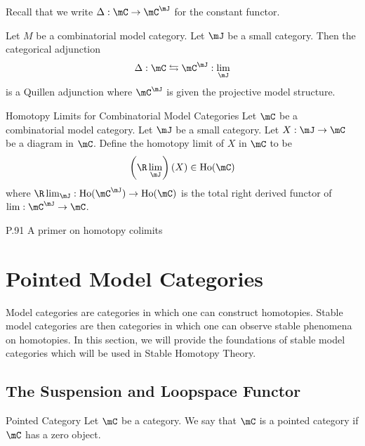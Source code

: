 \documentclass[a4paper]{article}
\begin{document}
Recall that we write $\Delta:\mC\to\mC^\mJ$ for the constant functor. 

\begin{prp}{}{} Let $M$ be a combinatorial model category. Let $\mJ$ be a small category. Then the categorical adjunction $$\Delta:\mC\leftrightarrows\mC^\mJ:\lim_\mJ$$ is a Quillen adjunction where $\mC^\mJ$ is given the projective model structure. 
\end{prp}

\begin{defn}{Homotopy Limits for Combinatorial Model Categories}{} Let $\mC$ be a combinatorial model category. Let $\mJ$ be a small category. Let $X:\mJ\to\mC$ be a diagram in $\mC$. Define the homotopy limit of $X$ in $\mC$ to be $$\left(\R\lim_\mJ\right)(X)\in\text{Ho}(\mC)$$ where $\R\lim_\mJ:\text{Ho}(\mC^\mJ)\to\text{Ho}(\mC)$ is the total right derived functor of $\lim:\mC^\mJ\to\mC$. 
\end{defn}

P.91 A primer on homotopy colimits


\pagebreak
\section{Pointed Model Categories}
Model categories are categories in which one can construct homotopies. Stable model categories are then categories in which one can observe stable phenomena on homotopies. In this section, we will provide the foundations of stable model categories which will be used in Stable Homotopy Theory. 

\subsection{The Suspension and Loopspace Functor}
\begin{defn}{Pointed Category}{} Let $\mC$ be a category. We say that $\mC$ is a pointed category if $\mC$ has a zero object. 
\end{defn}
\end{document}
